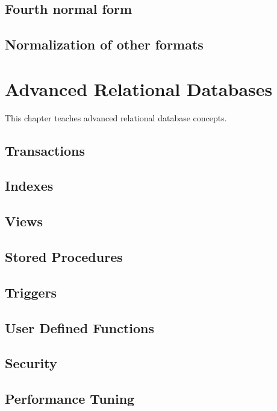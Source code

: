 \section{Fourth normal form}
\section{Normalization of other formats}

\chapter{Advanced Relational Databases}
\label{chap:relational:advanced-relational-databases}
This chapter teaches advanced relational database concepts.

\section{Transactions}
\section{Indexes}
\section{Views}
\section{Stored Procedures}
\section{Triggers}
\section{User Defined Functions}
\section{Security}
\section{Performance Tuning}


